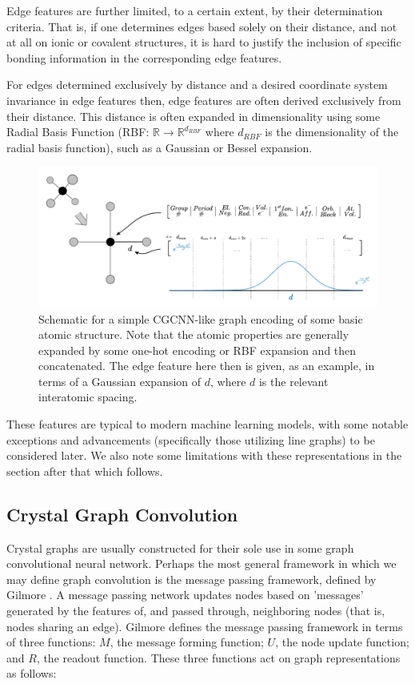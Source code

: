 \documentclass[10pt,a4paper]{article}
\begin{document}
Edge features are further limited, to a certain extent, by their determination criteria. That is, if one determines edges based solely on their distance, and not at all on ionic or covalent structures, it is hard to justify the inclusion of specific bonding information in the corresponding edge features. 

For edges determined exclusively by distance and a desired coordinate system invariance in edge features then, edge features are often derived exclusively from their distance. This distance is often expanded in dimensionality using some Radial Basis Function (RBF: $\mathbb{R}\rightarrow\mathbb{R}^{d_{RBF}}$ where $d_{RBF}$ is the dimensionality of the radial basis function), such as a Gaussian or Bessel expansion.


\begin{figure}

\begin{center}
\includegraphics[scale=0.5]{crystal_graph_feat.pdf}
\end{center}

\caption{Schematic for a simple CGCNN-like graph encoding of some basic atomic structure. Note that the atomic properties are generally expanded by some one-hot encoding or RBF expansion and then concatenated. The edge feature here then is given, as an example, in terms of a Gaussian expansion of $d$, where $d$ is the relevant interatomic spacing.}
\end{figure}
These features are typical to modern machine learning models, with some notable exceptions and advancements (specifically those utilizing line graphs) to be considered later. We also note some limitations with these representations in the section after that which follows.

\subsection{Crystal Graph Convolution}
Crystal graphs are usually constructed for their sole use in some graph convolutional neural network. Perhaps the most general framework in which we may define graph convolution is the message passing framework, defined by Gilmore \cite{mpnn}.
A message passing network updates nodes based on 'messages' generated by the features of, and passed through, neighboring nodes (that is, nodes sharing an edge). Gilmore defines the message passing framework in terms of three functions: $M$, the message forming function; $U$, the node update function; and $R$, the readout function. These three functions act on graph representations as follows:
\end{document}
